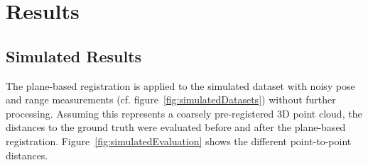 \section{Results}

\subsection{Simulated Results}

The plane-based registration is applied to the simulated dataset with noisy pose and range measurements (cf. figure~\ref{fig:simulatedDatasets}) without further processing.
Assuming this represents a coarsely pre-registered 3D point cloud, the distances to the ground truth were evaluated before and after the plane-based registration. 
Figure~\ref{fig:simulatedEvaluation} shows the different point-to-point distances. 


